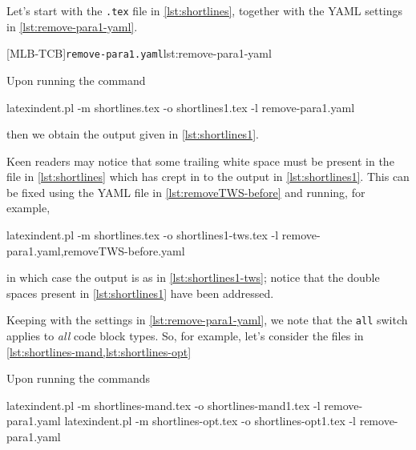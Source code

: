 	Let's start with the \texttt{.tex} file in \cref{lst:shortlines},
	together with the YAML settings in \cref{lst:remove-para1-yaml}.

        \begin{cmhtcbraster}
		[MLB-TCB]{\texttt{remove-para1.yaml}}{lst:remove-para1-yaml}
        \end{cmhtcbraster}

	Upon running the command
	\begin{commandshell}
latexindent.pl -m shortlines.tex -o shortlines1.tex -l remove-para1.yaml
\end{commandshell}
	then we obtain the output given in \cref{lst:shortlines1}.


	Keen readers may notice that some trailing white space must be present in the file in
	\cref{lst:shortlines} which has crept in to the output in
	\cref{lst:shortlines1}. This can be fixed using the YAML file in
	\vref{lst:removeTWS-before} and running, for example,
	\begin{commandshell}
latexindent.pl -m shortlines.tex -o shortlines1-tws.tex -l remove-para1.yaml,removeTWS-before.yaml  
    \end{commandshell}
	in which case the output is as in \cref{lst:shortlines1-tws}; notice that the double
	spaces present in \cref{lst:shortlines1} have been addressed.


	Keeping with the settings in \cref{lst:remove-para1-yaml}, we note that the
	\texttt{all} switch applies to \emph{all} code block
	types. So, for example, let's consider the files in \cref{lst:shortlines-mand,lst:shortlines-opt}

        \begin{cmhtcbraster}
        \end{cmhtcbraster}

	Upon running the commands
	\begin{widepage}
		\begin{commandshell}
latexindent.pl -m shortlines-mand.tex -o shortlines-mand1.tex -l remove-para1.yaml
latexindent.pl -m shortlines-opt.tex -o shortlines-opt1.tex -l remove-para1.yaml
\end{commandshell}
	\end{widepage}

